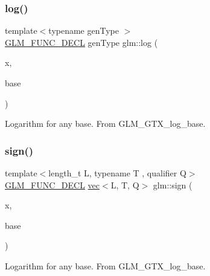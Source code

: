 \subsubsection{\texorpdfstring{log()}{log()}}
{\footnotesize\ttfamily template$<$typename gen\+Type $>$ \\
\mbox{\hyperlink{setup_8hpp_ab2d052de21a70539923e9bcbf6e83a51}{G\+L\+M\+\_\+\+F\+U\+N\+C\+\_\+\+D\+E\+CL}} gen\+Type glm\+::log (\begin{DoxyParamCaption}\item[{gen\+Type const \&}]{x,  }\item[{gen\+Type const \&}]{base }\end{DoxyParamCaption})}

Logarithm for any base. From G\+L\+M\+\_\+\+G\+T\+X\+\_\+log\+\_\+base. \mbox{\label{group__gtx__log__base_ga04ef803a24f3d4f8c67dbccb33b0fce0}} 
\subsubsection{\texorpdfstring{sign()}{sign()}}
{\footnotesize\ttfamily template$<$length\+\_\+t L, typename T , qualifier Q$>$ \\
\mbox{\hyperlink{setup_8hpp_ab2d052de21a70539923e9bcbf6e83a51}{G\+L\+M\+\_\+\+F\+U\+N\+C\+\_\+\+D\+E\+CL}} \mbox{\hyperlink{structglm_1_1vec}{vec}}$<$L, T, Q$>$ glm\+::sign (\begin{DoxyParamCaption}\item[{\mbox{\hyperlink{structglm_1_1vec}{vec}}$<$ L, T, Q $>$ const \&}]{x,  }\item[{\mbox{\hyperlink{structglm_1_1vec}{vec}}$<$ L, T, Q $>$ const \&}]{base }\end{DoxyParamCaption})}

Logarithm for any base. From G\+L\+M\+\_\+\+G\+T\+X\+\_\+log\+\_\+base. 